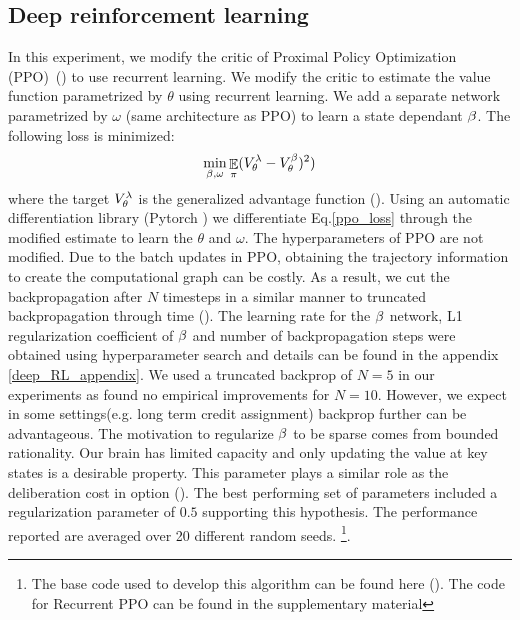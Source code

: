 \subsection{Deep reinforcement learning}

In this experiment, we modify the critic of Proximal Policy Optimization (PPO)~(\cite{schulman2017proximal}) to use recurrent learning. We modify the critic to estimate the value function parametrized by $\theta$ using recurrent learning. We add a separate network parametrized by $\omega$ (same architecture as PPO) to learn a state dependant $\beta$. The following loss is minimized:
\begin{equation}\label{ppo_loss}
    \min_{\beta,\omega} \mathop{\mathbb{E}}_{\pi}(V_{\theta}^{\lambda}-V^{\beta}_{\theta})^2)
\end{equation}
where the target $V_{\theta}^{\lambda}$ is the generalized advantage function (\cite{schulman2015high}). Using an automatic differentiation library (Pytorch \cite{paszke2017automatic}) we differentiate Eq.\ref{ppo_loss} through the modified estimate to learn the $\theta$ and $\omega$. The hyperparameters of PPO are not modified. Due to the batch updates in PPO, obtaining the trajectory information to create the computational graph can be costly. As a result, we cut the backpropagation after $N$ timesteps in a similar manner to truncated backpropagation through time (\cite{williams1995gradient}). The learning rate for the $\beta$ network, L1 regularization coefficient of $\beta$ and number of backpropagation steps were obtained using hyperparameter search and details can be found in the appendix \ref{deep_RL_appendix}. We used a truncated backprop of $N=5$ in our experiments as found no empirical improvements for $N=10$. However, we expect in some settings(e.g. long term credit assignment) backprop further can be advantageous. The motivation to regularize $\beta$ to be sparse comes from bounded rationality. Our brain has limited capacity and only updating the value at key states is a desirable property. This parameter plays a similar role as the deliberation cost in option (\cite{harb2018waiting}). The best performing set of parameters included a regularization parameter of $0.5$ supporting this hypothesis. The performance reported are averaged over 20 different random seeds. \footnote{The base code used to develop this algorithm can be found here (\cite{pytorchrl}). The code for Recurrent PPO can be found in the supplementary material}.

